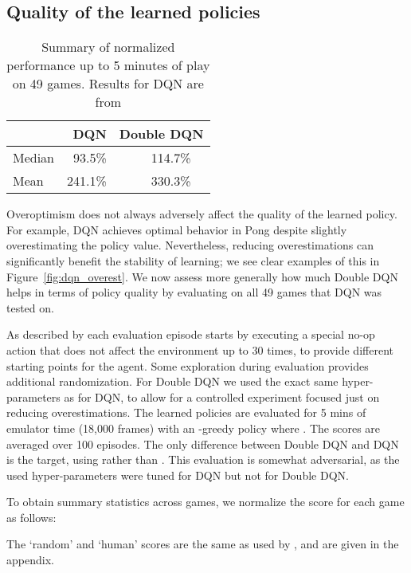 \documentclass[letterpaper]{article}
\begin{document}
\subsection{Quality of the learned policies}
\label{sec:result:quality}
\begin{table}[t]
\centering
 \def\arraystretch{1.1}
 \begin{tabular}{|l|rr|}
 \hline
  		        &\small DQN & \small Double DQN 		\\ \hline 
 \small Median  &\small ~93.5\% 	& \small 114.7\%~~       \\ \hline 
 \small Mean    &\small 241.1\% 	& \small 330.3\%~~ 	    \\ \hline 
  \end{tabular}
\caption{\small Summary of normalized performance up to 5 minutes of play on 49 games.  Results for DQN are from \citet{Mnih:2015}}
\label{tableresults}
\end{table}

Overoptimism does not always adversely affect the quality of the learned policy.
For example, DQN achieves optimal behavior in Pong despite slightly overestimating the policy value.
Nevertheless, reducing overestimations can significantly benefit the stability of learning; we see clear examples of this in Figure~\ref{fig:dqn_overest}. We now assess more generally how much Double DQN helps in terms of policy quality by evaluating on all 49 games that DQN was tested on.

As described by \citet{Mnih:2015} each evaluation episode starts by executing a special
no-op action that does not affect the environment up to 30 times, to provide different starting points for the agent.
Some exploration
during evaluation provides additional randomization.
For Double DQN we used the exact same hyper-parameters as for DQN, to allow for a controlled experiment focused just on reducing overestimations.  The learned policies are evaluated for 5 mins of emulator time (18,000 frames)
with an -greedy policy where . The scores are averaged over 100 episodes.
The only difference between Double DQN and DQN is the target, using  rather than .
This evaluation is somewhat adversarial, as the used hyper-parameters were tuned for DQN but not for Double DQN.

To obtain summary statistics across games, we normalize the score for each game as follows:

The `random' and `human' scores are the same as used by \citet{Mnih:2015}, and are given in the appendix.
\end{document}
